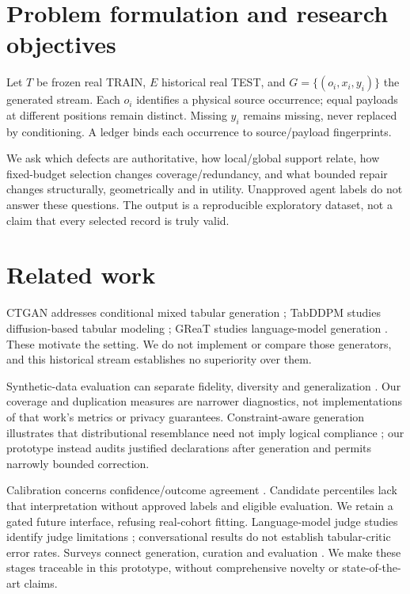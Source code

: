 \section{Problem formulation and research objectives}
Let $T$ be frozen real TRAIN, $E$ historical real TEST, and $G=\{(o_i,x_i,y_i)\}$ the generated stream. Each $o_i$ identifies a physical source occurrence; equal payloads at different positions remain distinct. Missing $y_i$ remains missing, never replaced by conditioning. A ledger binds each occurrence to source/payload fingerprints.

We ask which defects are authoritative, how local/global support relate, how fixed-budget selection changes coverage/redundancy, and what bounded repair changes structurally, geometrically and in utility. Unapproved agent labels do not answer these questions. The output is a reproducible exploratory dataset, not a claim that every selected record is truly valid.

\section{Related work}
CTGAN addresses conditional mixed tabular generation \citep{xu2019ctgan}; TabDDPM studies diffusion-based tabular modeling \citep{kotelnikov2023tabddpm}; GReaT studies language-model generation \citep{borisov2023great}. These motivate the setting. We do not implement or compare those generators, and this historical stream establishes no superiority over them.

Synthetic-data evaluation can separate fidelity, diversity and generalization \citep{alaa2022faithful}. Our coverage and duplication measures are narrower diagnostics, not implementations of that work's metrics or privacy guarantees. Constraint-aware generation illustrates that distributional resemblance need not imply logical compliance \citep{stoian2024realistic}; our prototype instead audits justified declarations after generation and permits narrowly bounded correction.

Calibration concerns confidence/outcome agreement \citep{guo2017calibration}. Candidate percentiles lack that interpretation without approved labels and eligible evaluation. We retain a gated future interface, refusing real-cohort fitting. Language-model judge studies identify judge limitations \citep{zheng2023judging}; conversational results do not establish tabular-critic error rates. Surveys connect generation, curation and evaluation \citep{long2024survey}. We make these stages traceable in this prototype, without comprehensive novelty or state-of-the-art claims.

